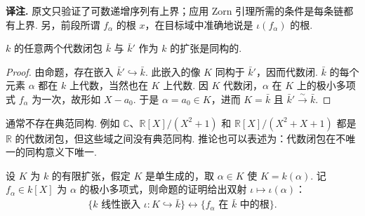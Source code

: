 \noindent\textbf{译注.} 原文只验证了可数递增序列有上界；应用 Zorn 引理所需的条件是每条链都有上界. 另，前段所谓 $f_\alpha$ 的根 $x$，在目标域中准确地说是 $\iota(f_\alpha)$ 的根.
\begin{corollary*}
$k$ 的任意两个代数闭包 $\bar k$ 与 $\bar k'$ 作为 $k$ 的扩张是同构的.
\end{corollary*}
\begin{proof}
由命题，存在嵌入 $\bar k'\hookrightarrow\bar k$. 此嵌入的像 $K$ 同构于 $\bar k'$，因而代数闭. $\bar k$ 的每个元素 $\alpha$ 都在 $k$ 上代数，当然也在 $K$ 上代数. 因 $K$ 代数闭，$\alpha$ 在 $K$ 上的极小多项式 $f_\alpha$ 为一次，故形如 $X-a_0$. 于是 $\alpha=a_0\in K$，进而 $K=\bar k$ 且 $\bar k'\xrightarrow{\sim}\bar k$.
\end{proof}
\begin{remark*}
通常不存在典范同构. 例如 $\mathbb C$、$\mathbb R[X]/(X^2+1)$ 和 $\mathbb R[X]/(X^2+X+1)$ 都是 $\mathbb R$ 的代数闭包，但这些域之间没有典范同构. 推论也可以表述为：代数闭包在不唯一的同构意义下唯一.
\end{remark*}
\begin{remark*}
设 $K$ 为 $k$ 的有限扩张，假定 $K$ 是单生成的，取 $\alpha\in K$ 使 $K=k(\alpha)$. 记 $f_\alpha\in k[X]$ 为 $\alpha$ 的极小多项式，则命题的证明给出双射 $\iota\mapsto\iota(\alpha)$：
\begin{align*}
\{k\text{ 线性嵌入 }\iota:K\hookrightarrow\bar k\}\longleftrightarrow\{f_\alpha\text{ 在 }\bar k\text{ 中的根}\}.
\end{align*}
\end{remark*}

